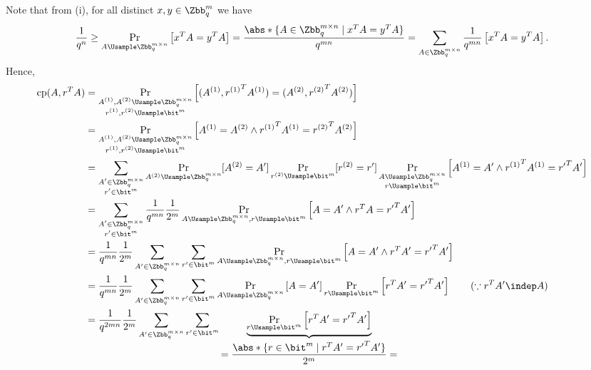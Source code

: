 \begin{answer}[ii]
    Note that from (i), for all distinct $x,y\in \Zbb_q^m$ we have
    \begin{equation}\label{eq:p2-2-1}
        \frac{1}{q^n} \ge 
        \Pr_{A\Usample \Zbb_q^{m\times n}}\left[x^T A = y^TA\right]
        = \frac{\abs*{ \{ A\in \Zbb_q^{m\times n}\mid x^T A = y^TA\}}}{q^{mn}}
        = \sum_{A\in \Zbb_q^{m\times n}}\frac{1}{q^{mn}}\left[x^T A = y^TA\right].
    \end{equation}
    Hence,
    \begin{align*}
        \mathop{\textrm{cp}}(A, r^TA)
        &= \Pr_{\substack{A^{(1)},A^{(2)}\Usample \Zbb_q^{m\times n}\\r^{(1)},r^{(2)}\Usample\bit^{m}}}\left[(A^{(1)},{r^{(1)}}^TA^{(1)})=(A^{(2)},{{r^{(2)}}}^TA^{(2)})\right]\\
        &= \Pr_{\substack{A^{(1)},A^{(2)}\Usample \Zbb_q^{m\times n}\\r^{(1)},r^{(2)}\Usample\bit^{m}}}\left[A^{(1)} =A^{(2)} \land {r^{(1)}}^TA^{(1)} = {r^{(2)}}^TA^{(2)}\right]\\
        &= \sum_{\substack{A'\in  \Zbb_q^{m\times n}\\r'\in \bit^m}} \Pr_{A^{(2)}\Usample \Zbb_q^{m\times n}}[A^{(2)}=A']\Pr_{r^{(2)}\Usample\bit^{m}}[r^{(2)}=r']  \Pr_{\substack{A\Usample \Zbb_q^{m\times n}\\ r\Usample\bit^{m}}}\left[A^{(1)} =A' \land {r^{(1)}}^TA^{(1)} = {r'}^TA'\right]\\
        &= \sum_{\substack{A'\in  \Zbb_q^{m\times n}\\r'\in \bit^m}} \frac{1}{q^{mn}} \frac{1}{2^m}  \Pr_{A\Usample \Zbb_q^{m\times n}, r\Usample\bit^{m}}\left[A =A' \land r^T A = {r'}^TA'\right]\\
        &= \frac{1}{q^{mn}} \frac{1}{2^m} \sum_{A'\in  \Zbb_q^{m\times n}}\sum_{r'\in \bit^m}   \Pr_{A\Usample \Zbb_q^{m\times n}, r\Usample\bit^{m}}\left[A =A' \land r^T A' = {r'}^TA'\right]\\
        &= \frac{1}{q^{mn}} \frac{1}{2^m} \sum_{A'\in  \Zbb_q^{m\times n}}\sum_{r'\in \bit^m}   \Pr_{A\Usample \Zbb_q^{m\times n}}\left[A =A'\right] \Pr_{r\Usample\bit^{m}}\left[ r^T A' = {r'}^TA'\right]
        \qquad (\because r^TA' \indep A)\\
        &= \frac{1}{q^{2mn}} \frac{1}{2^m} \sum_{A'\in  \Zbb_q^{m\times n}}\sum_{r'\in \bit^m}   \underbrace{\Pr_{r\Usample\bit^{m}}\left[ r^T A' = {r'}^TA'\right]}_{\begin{aligned}= \frac{\abs*{\{r\in\bit^m\mid r^T A' = {r'}^TA'\}}}{2^m}=\end{aligned}}\\

\end{align*}
\end{answer}
